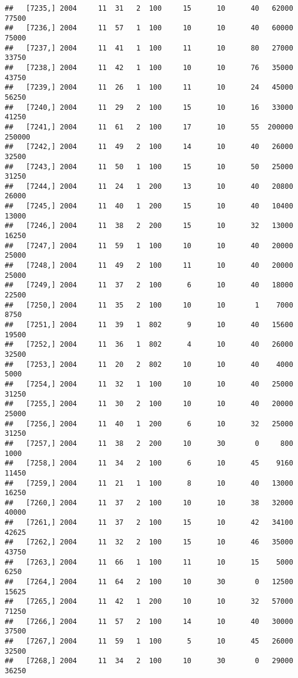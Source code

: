 \documentclass{article}\usepackage[]{graphicx}\usepackage[]{color}
\makeatletter
\newenvironment{kframe}{%
 \def\at@end@of@kframe{}%
 \ifinner\ifhmode%
  \def\at@end@of@kframe{\end{minipage}}%
  \begin{minipage}{\columnwidth}%
 \fi\fi%
 \def\FrameCommand##1{\hskip\@totalleftmargin \hskip-\fboxsep
 \colorbox{shadecolor}{##1}\hskip-\fboxsep
     \hskip-\linewidth \hskip-\@totalleftmargin \hskip\columnwidth}%
 \MakeFramed {\advance\hsize-\width
   \@totalleftmargin\z@ \linewidth\hsize
   \@setminipage}}%
 {\par\unskip\endMakeFramed%
 \at@end@of@kframe}
\newenvironment{knitrout}{}{} %
\makeatother
\begin{document}
\begin{knitrout}
\begin{kframe}
\begin{verbatim}
##   [7235,] 2004     11  31   2  100     15      10      40   62000   77500
##   [7236,] 2004     11  57   1  100     10      10      40   60000   75000
##   [7237,] 2004     11  41   1  100     11      10      80   27000   33750
##   [7238,] 2004     11  42   1  100     10      10      76   35000   43750
##   [7239,] 2004     11  26   1  100     11      10      24   45000   56250
##   [7240,] 2004     11  29   2  100     15      10      16   33000   41250
##   [7241,] 2004     11  61   2  100     17      10      55  200000  250000
##   [7242,] 2004     11  49   2  100     14      10      40   26000   32500
##   [7243,] 2004     11  50   1  100     15      10      50   25000   31250
##   [7244,] 2004     11  24   1  200     13      10      40   20800   26000
##   [7245,] 2004     11  40   1  200     15      10      40   10400   13000
##   [7246,] 2004     11  38   2  200     15      10      32   13000   16250
##   [7247,] 2004     11  59   1  100     10      10      40   20000   25000
##   [7248,] 2004     11  49   2  100     11      10      40   20000   25000
##   [7249,] 2004     11  37   2  100      6      10      40   18000   22500
##   [7250,] 2004     11  35   2  100     10      10       1    7000    8750
##   [7251,] 2004     11  39   1  802      9      10      40   15600   19500
##   [7252,] 2004     11  36   1  802      4      10      40   26000   32500
##   [7253,] 2004     11  20   2  802     10      10      40    4000    5000
##   [7254,] 2004     11  32   1  100     10      10      40   25000   31250
##   [7255,] 2004     11  30   2  100     10      10      40   20000   25000
##   [7256,] 2004     11  40   1  200      6      10      32   25000   31250
##   [7257,] 2004     11  38   2  200     10      30       0     800    1000
##   [7258,] 2004     11  34   2  100      6      10      45    9160   11450
##   [7259,] 2004     11  21   1  100      8      10      40   13000   16250
##   [7260,] 2004     11  37   2  100     10      10      38   32000   40000
##   [7261,] 2004     11  37   2  100     15      10      42   34100   42625
##   [7262,] 2004     11  32   2  100     15      10      46   35000   43750
##   [7263,] 2004     11  66   1  100     11      10      15    5000    6250
##   [7264,] 2004     11  64   2  100     10      30       0   12500   15625
##   [7265,] 2004     11  42   1  200     10      10      32   57000   71250
##   [7266,] 2004     11  57   2  100     14      10      40   30000   37500
##   [7267,] 2004     11  59   1  100      5      10      45   26000   32500
##   [7268,] 2004     11  34   2  100     10      30       0   29000   36250

\end{verbatim}
\end{kframe}
\end{knitrout}
\end{document}

